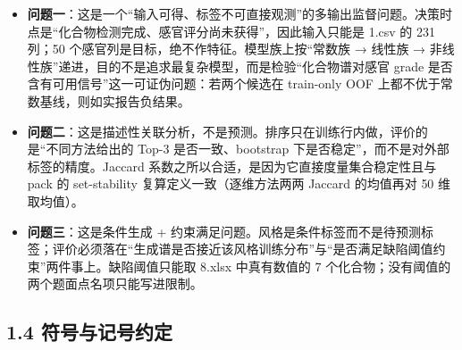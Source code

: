 \documentclass[
  11pt,
]{ctexart}
\providecommand{\tightlist}{%
  \setlength{\itemsep}{0pt}\setlength{\parskip}{0pt}}
\begin{document}
\begin{itemize}
\tightlist
\item
  \textbf{问题一}：这是一个``输入可得、标签不可直接观测''的多输出监督问题。决策时点是``化合物检测完成、感官评分尚未获得''，因此输入只能是
  1.csv 的 231 列；50 个感官列是目标，绝不作特征。模型族上按``常数族 →
  线性族 →
  非线性族''递进，目的不是追求最复杂模型，而是检验``化合物谱对感官 grade
  是否含有可用信号''这一可证伪问题：若两个候选在 train-only OOF
  上都不优于常数基线，则如实报告负结果。
\item
  \textbf{问题二}：这是描述性关联分析，不是预测。排序只在训练行内做，评价的是``不同方法给出的
  Top-3 是否一致、bootstrap
  下是否稳定''，而不是对外部标签的精度。Jaccard
  系数之所以合适，是因为它直接度量集合稳定性且与 pack 的 set-stability
  复算定义一致（逐维方法两两 Jaccard 的均值再对 50 维取均值）。
\item
  \textbf{问题三}：这是条件生成 +
  约束满足问题。风格是条件标签而不是待预测标签；评价必须落在``生成谱是否接近该风格训练分布''与``是否满足缺陷阈值约束''两件事上。缺陷阈值只能取
  8.xlsx 中真有数值的 7 个化合物；没有阈值的两个题面点名项只能写进限制。
\end{itemize}

\subsection{1.4
符号与记号约定}\label{ux7b26ux53f7ux4e0eux8bb0ux53f7ux7ea6ux5b9a}
\end{document}
